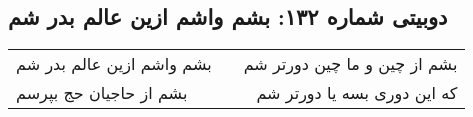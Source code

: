\begin{center}
\section*{دوبیتی شماره ۱۳۲: بشم واشم ازین عالم بدر شم}
\label{sec:132}
\begin{longtable}{l p{0.5cm} r}
بشم واشم ازین عالم بدر شم
&&
بشم از چین و ما چین دورتر شم
\\
بشم از حاجیان حج بپرسم
&&
که این دوری بسه یا دورتر شم
\\
\end{longtable}
\end{center}
